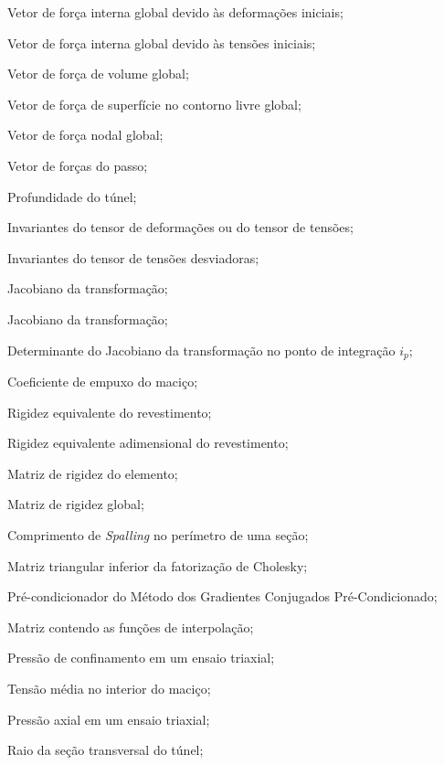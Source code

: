 \item[$\Fl_{\varepsilon_{0}}$]	Vetor de força interna global devido às deformações iniciais;
\item[$\Fl_{\sigma_{0}}$]	Vetor de força interna global devido às tensões iniciais;
\item[$\Fl_{V}$]	Vetor de força de volume global;
\item[$\Fl_{S}$]	Vetor de força de superfície no contorno livre global;
\item[$\Fl_{N}$]	Vetor de força nodal global;

\item[$\Fl_{p}$]	Vetor de forças do passo;

\item[$H$]				Profundidade do túnel;
\item[$I_1,I_2,I_3$] 	Invariantes do tensor de deformações ou do tensor de tensões;
\item[$J_2,J_3$] 	Invariantes do tensor de tensões desviadoras;
\item[$J$] 		Jacobiano da transformação;
\item[$\Jll$] 		Jacobiano da transformação;
\item[$J_{i_p}$ ] 				Determinante do Jacobiano da transformação no ponto de integração $i_p$;
\item[$K$]				Coeficiente de empuxo do maciço;
\item[$K_r$]			Rigidez equivalente do revestimento;
\item[$K_r^*$]			Rigidez equivalente adimensional do revestimento;
\item[$\Kll_e$]			Matriz de rigidez do elemento;
\item[$\Kll$]			Matriz de rigidez global;
\item[$L_s$]			Comprimento de \textit{Spalling} no perímetro de uma seção;
\item[$\Lll$]			Matriz triangular inferior da fatorização de Cholesky;
\item[$\Mll$]			Pré-condicionador do Método dos Gradientes Conjugados Pré-Condicionado;
\item[$\Nll$]			Matriz contendo as funções de interpolação;
\item[$ P $] 			Pressão de confinamento em um ensaio triaxial;
\item[$ P_0 $] 			Tensão média no interior do maciço;
\item[$ Q $] 			Pressão axial em um ensaio triaxial;
\item[$ R $]			Raio da seção transversal do túnel;
